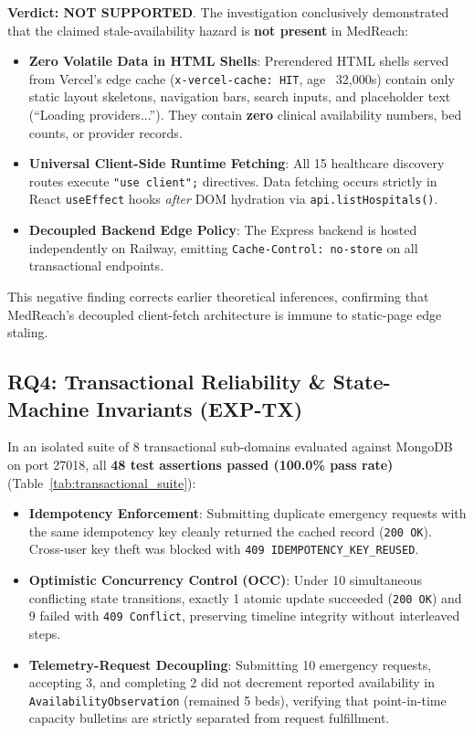 \documentclass[conference]{IEEEtran}
\begin{document}
\textbf{Verdict: NOT SUPPORTED}. The investigation conclusively demonstrated that the claimed stale-availability hazard is \textbf{not present} in MedReach:
\begin{itemize}
    \item \textbf{Zero Volatile Data in HTML Shells}: Prerendered HTML shells served from Vercel's edge cache (\texttt{x-vercel-cache: HIT}, age ~32,000s) contain only static layout skeletons, navigation bars, search inputs, and placeholder text (``Loading providers...''). They contain \textbf{zero} clinical availability numbers, bed counts, or provider records.
    \item \textbf{Universal Client-Side Runtime Fetching}: All 15 healthcare discovery routes execute \texttt{"use client";} directives. Data fetching occurs strictly in React \texttt{useEffect} hooks \textit{after} DOM hydration via \texttt{api.listHospitals()}.
    \item \textbf{Decoupled Backend Edge Policy}: The Express backend is hosted independently on Railway, emitting \texttt{Cache-Control: no-store} on all transactional endpoints.
\end{itemize}

This negative finding corrects earlier theoretical inferences, confirming that MedReach's decoupled client-fetch architecture is immune to static-page edge staling.

\subsection{RQ4: Transactional Reliability \& State-Machine Invariants (EXP-TX)}
In an isolated suite of 8 transactional sub-domains evaluated against MongoDB on port 27018, all \textbf{48 test assertions passed (100.0\% pass rate)} (Table~\ref{tab:transactional_suite}):
\begin{itemize}
    \item \textbf{Idempotency Enforcement}: Submitting duplicate emergency requests with the same idempotency key cleanly returned the cached record (\texttt{200 OK}). Cross-user key theft was blocked with \texttt{409 IDEMPOTENCY\_KEY\_REUSED}.
    \item \textbf{Optimistic Concurrency Control (OCC)}: Under 10 simultaneous conflicting state transitions, exactly 1 atomic update succeeded (\texttt{200 OK}) and 9 failed with \texttt{409 Conflict}, preserving timeline integrity without interleaved steps.
    \item \textbf{Telemetry-Request Decoupling}: Submitting 10 emergency requests, accepting 3, and completing 2 did not decrement reported availability in \texttt{AvailabilityObservation} (remained 5 beds), verifying that point-in-time capacity bulletins are strictly separated from request fulfillment.
\end{itemize}
\end{document}
